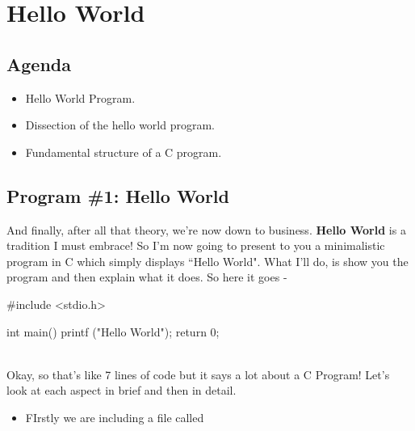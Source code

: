 \chapter{Hello World}


\section{Agenda}
\begin{itemize}
 \item Hello World Program.
 \item Dissection of the hello world program.
 \item Fundamental structure of a C program.
\end{itemize}

\section{Program \#1: Hello World}
And finally, after all that theory, we're now down to business. \textbf{Hello World} is a tradition I must embrace! So I'm now going to present to you a minimalistic program in C which simply displays ``Hello World". What I'll do, is show you the program and then explain what it does. So here it goes - \\

\begin{ccode}
#include <stdio.h>

int main()
{
  printf ("Hello World\n");
  return 0;
}
\end{ccode}
\\

Okay, so that's like 7 lines of code but it says a lot about a C Program! Let's look at each aspect in brief and then in detail.

\begin{itemize}
\item FIrstly we are including a file called 
\end{itemize}
